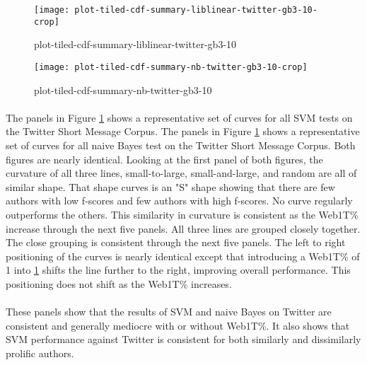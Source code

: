 	\begin{figure}[htbp!]
		\begin{center}
		\centering
		\texttt{[image: plot-tiled-cdf-summary-liblinear-twitter-gb3-10-crop]}
		\caption{plot-tiled-cdf-summary-liblinear-twitter-gb3-10}
		\label{fig:plot-tiled-cdf-summary-liblinear-twitter-gb3-10}
		\end{center}
	\end{figure}
	
	\begin{figure}[htbp!]
		\begin{center}
		\centering
		\texttt{[image: plot-tiled-cdf-summary-nb-twitter-gb3-10-crop]}
		\caption{plot-tiled-cdf-summary-nb-twitter-gb3-10}
		\label{fig:plot-tiled-cdf-summary-nb-twitter-gb3-10}
		\end{center}
	\end{figure}
	
		\paragraph*{}  The panels in Figure \ref{fig:plot-tiled-cdf-summary-liblinear-twitter-gb3-10} shows a representative set of curves for all SVM tests on the Twitter Short Message Corpus.  The panels in Figure \ref{fig:plot-tiled-cdf-summary-liblinear-twitter-gb3-10} shows a representative set of curves for all naive Bayes test on the Twitter Short Message Corpus. Both figures are nearly identical.  Looking at the first panel of both figures, the curvature of all three lines, small-to-large, small-and-large, and random are all of similar shape.  That shape curves is an "S" shape showing that there are few authors with low f-scores and few authors with high f-scores. No curve regularly outperforms the others. This similarity in curvature is consistent as the Web1T\% increase through the next five panels. All three lines are grouped closely together.  The close grouping is consistent through the next five panels. The left to right positioning of the curves is nearly identical except that introducing a Web1T\% of 1 into \ref{fig:plot-tiled-cdf-summary-liblinear-twitter-gb3-10} shifts the line further to the right, improving overall performance.  This positioning does not shift as the Web1T\% increases.
		\paragraph*{} These panels show that the results of SVM and naive Bayes on Twitter are consistent and generally mediocre with or without Web1T\%.  It also shows that SVM performance against Twitter is consistent for both similarly and dissimilarly prolific authors.

